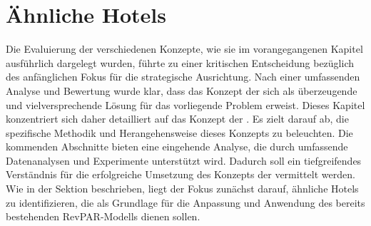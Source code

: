 \chapter{Ähnliche Hotels}
\label{chap:Similar_hotels}
Die Evaluierung der verschiedenen Konzepte, wie sie im vorangegangenen Kapitel \emph{} ausführlich dargelegt wurden, führte zu einer kritischen Entscheidung bezüglich des anfänglichen Fokus für die strategische Ausrichtung. Nach einer umfassenden Analyse und Bewertung wurde klar, dass das Konzept der \emph{} sich als überzeugende und vielversprechende Lösung für das vorliegende Problem erweist.
\newline
\newline
Dieses Kapitel konzentriert sich daher detailliert auf das Konzept der \emph{}. Es zielt darauf ab, die spezifische Methodik und Herangehensweise dieses Konzepts zu beleuchten. Die kommenden Abschnitte bieten eine eingehende Analyse, die durch umfassende Datenanalysen und Experimente unterstützt wird. Dadurch soll ein tiefgreifendes Verständnis für die erfolgreiche Umsetzung des Konzepts der \emph{} vermittelt werden.
\newline
\newline
Wie in der Sektion \emph{} beschrieben, liegt der Fokus zunächst darauf, ähnliche Hotels zu identifizieren, die als Grundlage für die Anpassung und Anwendung des bereits bestehenden RevPAR-Modells dienen sollen.

